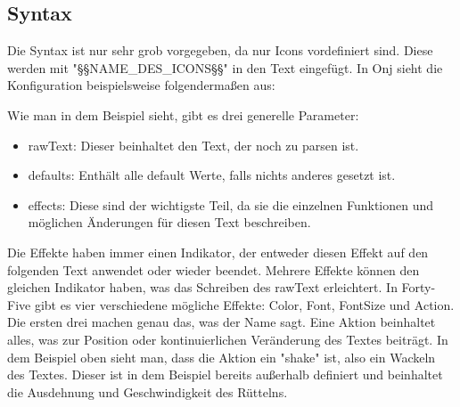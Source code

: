 
\renewcommand{\kapitelautor}{Autor: Felix Zwickelstorfer}
\subsection{Syntax}\label{subsec:syntax}
\renewcommand{\kapitelautor}{Autor: Felix Zwickelstorfer}

Die Syntax ist nur sehr grob vorgegeben, da nur Icons vordefiniert sind.
Diese werden mit "§§NAME_DES_ICONS§§" in den Text eingefügt.
In Onj sieht die Konfiguration beispielsweise folgendermaßen aus:

Wie man in dem Beispiel sieht, gibt es drei generelle Parameter:
\begin{itemize}
    \item rawText: Dieser beinhaltet den Text, der noch zu parsen ist.
    \item defaults: Enthält alle default Werte, falls nichts anderes gesetzt ist.
    \item effects: Diese sind der wichtigste Teil, da sie die einzelnen Funktionen und möglichen Änderungen für diesen Text beschreiben.
\end{itemize}

Die Effekte haben immer einen Indikator, der entweder diesen Effekt auf den folgenden Text anwendet oder wieder beendet.
Mehrere Effekte können den gleichen Indikator haben, was das Schreiben des rawText erleichtert.
In Forty-Five gibt es vier verschiedene mögliche Effekte: Color, Font, FontSize und Action.
Die ersten drei machen genau das, was der Name sagt.
Eine Aktion beinhaltet alles, was zur Position oder kontinuierlichen Veränderung des Textes beiträgt.
In dem Beispiel oben sieht man, dass die Aktion ein "shake" ist, also ein Wackeln des Textes.
Dieser ist in dem Beispiel bereits außerhalb definiert und beinhaltet die Ausdehnung und Geschwindigkeit des Rüttelns.